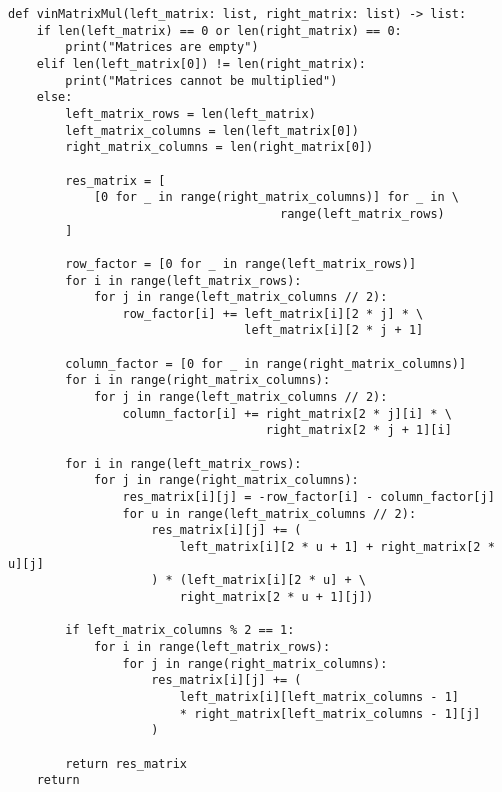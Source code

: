 \begin{lstlisting}[label=multVin, caption=Алгоритм умножения матриц Винограда]
def vinMatrixMul(left_matrix: list, right_matrix: list) -> list:
    if len(left_matrix) == 0 or len(right_matrix) == 0:
        print("Matrices are empty")
    elif len(left_matrix[0]) != len(right_matrix):
        print("Matrices cannot be multiplied")
    else:
        left_matrix_rows = len(left_matrix)
        left_matrix_columns = len(left_matrix[0])
        right_matrix_columns = len(right_matrix[0])

        res_matrix = [
            [0 for _ in range(right_matrix_columns)] for _ in \
                                      range(left_matrix_rows)
        ]

        row_factor = [0 for _ in range(left_matrix_rows)]
        for i in range(left_matrix_rows):
            for j in range(left_matrix_columns // 2):
                row_factor[i] += left_matrix[i][2 * j] * \
                                 left_matrix[i][2 * j + 1]

        column_factor = [0 for _ in range(right_matrix_columns)]
        for i in range(right_matrix_columns):
            for j in range(left_matrix_columns // 2):
                column_factor[i] += right_matrix[2 * j][i] * \
                                    right_matrix[2 * j + 1][i]

        for i in range(left_matrix_rows):
            for j in range(right_matrix_columns):
                res_matrix[i][j] = -row_factor[i] - column_factor[j]
                for u in range(left_matrix_columns // 2):
                    res_matrix[i][j] += (
                        left_matrix[i][2 * u + 1] + right_matrix[2 * u][j]
                    ) * (left_matrix[i][2 * u] + \
                        right_matrix[2 * u + 1][j])

        if left_matrix_columns % 2 == 1:
            for i in range(left_matrix_rows):
                for j in range(right_matrix_columns):
                    res_matrix[i][j] += (
                        left_matrix[i][left_matrix_columns - 1]
                        * right_matrix[left_matrix_columns - 1][j]
                    )

        return res_matrix
    return
\end{lstlisting}

